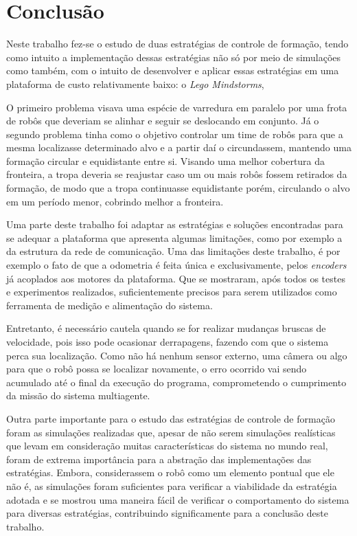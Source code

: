 \chapter{Conclusão}
\label{chap:conclusao}

Neste trabalho fez-se o estudo de duas estratégias de controle de formação, tendo como intuito a implementação dessas estratégias não só por meio de simulações como também, com o intuito de desenvolver e aplicar essas estratégias em uma plataforma de custo relativamente baixo: o \emph{Lego Mindstorms\textregistered},  

O primeiro problema visava uma espécie de varredura em paralelo por uma frota de robôs que deveriam se alinhar e seguir se deslocando em conjunto. Já o segundo problema tinha como o objetivo controlar um time de robôs para que a mesma localizasse determinado alvo e a partir daí o circundassem, mantendo uma formação circular e equidistante entre si. Visando uma melhor cobertura da fronteira, a tropa deveria se reajustar caso um ou mais robôs fossem retirados da formação, de modo que a tropa continuasse equidistante porém, circulando o alvo em um período menor, cobrindo melhor a fronteira.

Uma parte deste trabalho foi adaptar as estratégias e soluções encontradas para se adequar a plataforma que apresenta algumas limitações, como por exemplo a da estrutura da rede de comunicação. Uma das limitações deste trabalho, é por exemplo o fato de que a odometria é feita única e exclusivamente, pelos \emph{encoders} já acoplados aos motores da plataforma. Que se mostraram, após todos os testes e experimentos realizados, suficientemente precisos para serem utilizados como ferramenta de medição e alimentação do sistema. 

Entretanto, é necessário cautela quando se for realizar mudanças bruscas de velocidade, pois isso pode ocasionar derrapagens, fazendo com que o sistema perca sua localização. Como não há nenhum %
sensor externo, uma câmera ou algo para que o robô possa se localizar novamente, o erro ocorrido vai sendo acumulado até o final da execução do programa, comprometendo o cumprimento da missão do sistema multiagente.%

Outra parte importante para o estudo das estratégias de controle de formação foram as simulações realizadas que, apesar de não serem simulações realísticas que levam em consideração muitas características do sistema no mundo real, foram de extrema importância para a abstração das implementações das estratégias. Embora, considerassem o robô como um elemento pontual que ele não é, as simulações foram suficientes para verificar a viabilidade da estratégia adotada e se mostrou uma maneira fácil de verificar o comportamento do sistema para diversas estratégias, contribuindo significamente para a conclusão deste trabalho.

